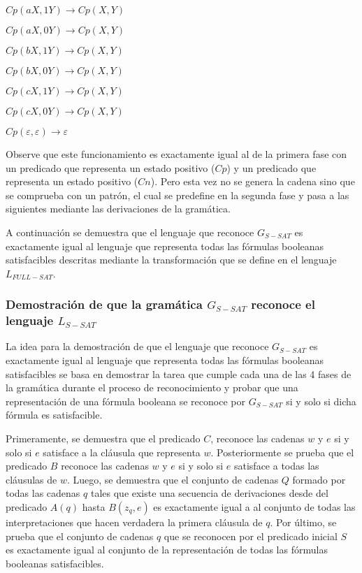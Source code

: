 \begin{itemize}
\begin{enumerate}[start=23]
\begin{multicols}{2}
                  \item $Cp(aX,1Y) \to Cp(X,Y)$
                  \item $Cp(aX,0Y) \to Cp(X,Y)$
                  \item $Cp(bX,1Y) \to Cp(X,Y)$
                  \item $Cp(bX,0Y) \to Cp(X,Y)$
                  \item $Cp(cX,1Y) \to Cp(X,Y)$
                  \item $Cp(cX,0Y) \to Cp(X,Y)$
                  \item $Cp(\varepsilon,\varepsilon)\to \varepsilon$
              \end{multicols}
          \end{enumerate}
          
          Observe que este funcionamiento es exactamente igual al de la primera fase con un predicado que representa un
          estado positivo ($Cp$) y un predicado que representa un estado positivo ($Cn$). Pero esta vez no se genera
          la cadena sino que se comprueba con un patrón, el cual se predefine en la segunda fase y pasa a las
          siguientes mediante las derivaciones de la gramática.
          
\end{itemize}

A continuación se demuestra que el lenguaje que reconoce $G_{S-SAT}$ es exactamente igual al lenguaje que
representa todas las fórmulas booleanas satisfacibles descritas mediante la transformación que se define
en el lenguaje $L_{FULL-SAT}$.

\subsubsection{Demostración de que la gramática $G_{S-SAT}$ reconoce el lenguaje $L_{S-SAT}$}

La idea para la demostración de que el lenguaje que reconoce $G_{S-SAT}$ es exactamente igual al lenguaje que
representa todas las fórmulas booleanas satisfacibles se basa en demostrar la tarea que cumple cada una de las 4 fases de la gramática
durante el proceso de reconocimiento y probar que una representación de una fórmula booleana
se reconoce por $G_{S-SAT}$ si y solo si dicha fórmula es satisfacible.

Primeramente, se demuestra que el predicado $C$, reconoce las cadenas $w$ y $e$
si y solo si $e$ satisface a la cláusula que representa $w$. Posteriormente se prueba que el predicado $B$ reconoce las cadenas $w$ y $e$ si y solo si $e$ satisface a todas las
cláusulas de $w$. Luego, se demuestra que el conjunto de cadenas $Q$ formado por todas las cadenas $q$ tales que existe una secuencia de
derivaciones desde del predicado $A(q)$ hasta $B(z_q,e)$ es exactamente igual a al conjunto de todas las
interpretaciones que hacen verdadera la primera cláusula de $q$. Por último, se prueba que el conjunto de cadenas $q$ que se
reconocen por el predicado inicial $S$ es exactamente igual al conjunto de la representación de
todas las fórmulas booleanas satisfacibles.

